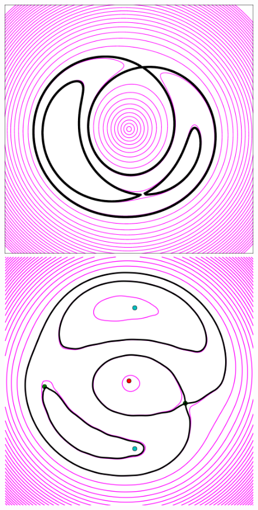 \documentclass[usenatbib]{mn2e}
\newlength{\myplotswidth}
\begin{document}
\begin{figure}
  \includegraphics[width=\myplotswidth]{fig/ASW0000h2m_007025_arriv}
  \includegraphics[width=\myplotswidth]{fig/007025_spaghetti} \\

\end{figure}
\end{document}
